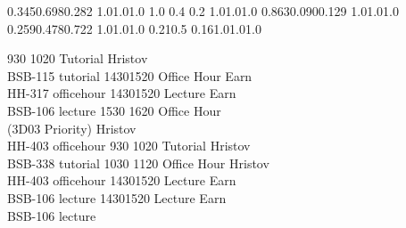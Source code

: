 
\noindent{}

\setslotsize{3.1cm}{0.5cm}
\settextframe{0.8mm}




    {0.345}{0.698}{0.282} {1.0}{1.0}{1.0}
    {1.0} {0.4} {0.2} {1.0}{1.0}{1.0}
 {0.863}{0.090}{0.129} {1.0}{1.0}{1.0}
   {0.259}{0.478}{0.722} {1.0}{1.0}{1.0}
       {0.21}{0.5} {0.16}{1.0}{1.0}{1.0}

\begin{timetable}
   {930} {1020} {Tutorial}       {Hristov\\BSB-115} {}      {tutorial}
   {1430}{1520} {Office Hour}    {Earn\\HH-317}    {}      {officehour}
   {1430}{1520} {Lecture}        {Earn\\BSB-106}    {}      {lecture}
   {1530} {1620} {Office Hour\\{\small(3D03 Priority)}}   {Hristov\\HH-403} {}      {officehour}
   {930} {1020} {Tutorial}       {Hristov\\BSB-338} {}      {tutorial}
   {1030} {1120} {Office Hour}   {Hristov\\HH-403} {}      {officehour}
   {1430}{1520} {Lecture}        {Earn\\BSB-106}    {}      {lecture}
   {1430}{1520} {Lecture}        {Earn\\BSB-106}    {}      {lecture}
\end{timetable}
